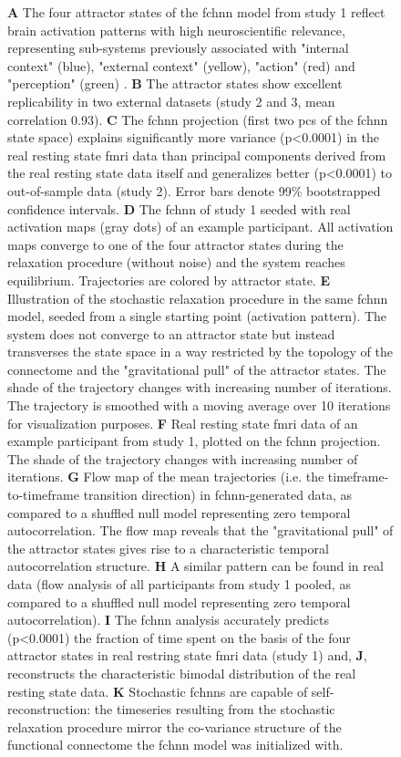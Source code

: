 \documentclass{article}
\begin{document}
\begin{figure}[!htbp]
{\textbf{A} The four attractor states of the \acrshort{fchnn} model from study 1 reflect brain activation
patterns with high neuroscientific relevance, representing sub-systems previously associated with "internal context"
(blue), "external context" (yellow), "action" (red) and "perception" (green)
\citep{golland2008data, cioli2014differences, chen2018human, fuster2004upper, margulies2016situating}.
\textbf{B} The attractor states show excellent replicability in two external datasets (study 2 and 3, mean correlation 0.93).
\textbf{C} The \acrshort{fchnn} projection (first two \acrshort{pc}s of the \acrshort{fchnn} state space) explains significantly more variance (p\textless 0.0001) in the real
resting state \acrshort{fmri} data than principal components derived from the real resting state data itself and generalizes
better (p\textless 0.0001) to out-of-sample data (study 2). Error bars denote 99\% bootstrapped confidence intervals.
\textbf{D} The \acrshort{fchnn} of study 1 seeded with real activation maps (gray dots) of an example participant. All activation maps converge to one of the four attractor states during the relaxation procedure (without noise) and the system reaches equilibrium. Trajectories are colored by attractor state.
\textbf{E} Illustration of the stochastic relaxation procedure in the same \acrshort{fchnn} model, seeded from a single starting point (activation pattern). The system does not converge to an attractor state but instead transverses the state space in a way restricted by the topology of the connectome and the "gravitational pull" of the attractor states. The shade of the trajectory changes with increasing number of iterations. The trajectory is smoothed with a moving average over 10 iterations for visualization purposes.
\textbf{F} Real resting state \acrshort{fmri} data of an example participant from study 1, plotted on the \acrshort{fchnn} projection. The shade of the trajectory changes with increasing number of iterations.
\textbf{G} Flow map of the mean trajectories (i.e. the timeframe-to-timeframe transition direction) in \acrshort{fchnn}-generated data, as compared to a shuffled null model representing zero temporal autocorrelation. The flow map reveals that the "gravitational pull" of the attractor states gives rise to a characteristic temporal autocorrelation structure.
\textbf{H} A similar pattern can be found in real data (flow analysis of all participants from study 1 pooled, as compared to a shuffled null model representing zero temporal autocorrelation).
\textbf{I} The \acrshort{fchnn} analysis accurately predicts (p\textless 0.0001) the fraction of time spent on the basis of the four attractor
states in real restring state \acrshort{fmri} data (study 1) and,
\textbf{J}, reconstructs the characteristic bimodal distribution of the real resting state data.
\textbf{K} Stochastic \acrshort{fchnn}s are capable of self-reconstruction: the timeseries resulting from the stochastic relaxation procedure
mirror the co-variance structure of the functional connectome the \acrshort{fchnn} model was initialized with.}
\label{rest-validity}
\end{figure}
\end{document}
